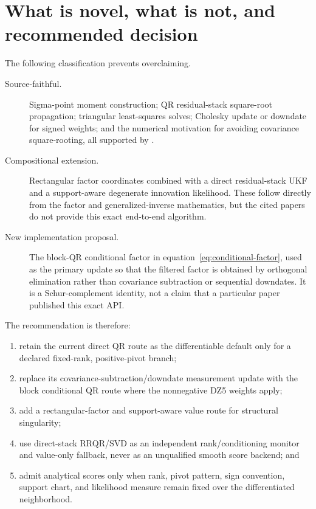 \documentclass[11pt]{article}
\begin{document}
\section{What is novel, what is not, and recommended decision}

The following classification prevents overclaiming.

\begin{description}
  \item[Source-faithful.] Sigma-point moment construction; QR residual-stack
    square-root propagation; triangular least-squares solves; Cholesky update or
    downdate for signed weights; and the numerical motivation for avoiding
    covariance square-rooting, all supported by
    \cite{vandermerwewan2001,arasaratnamhaykin2008,arasaratnamhaykin2009,
    kaminski1971,bierman1977}.
  \item[Compositional extension.] Rectangular factor coordinates combined with
    a direct residual-stack UKF and a support-aware degenerate innovation
    likelihood.  These follow directly from the factor and generalized-inverse
    mathematics, but the cited papers do not provide this exact end-to-end
    algorithm.
  \item[New implementation proposal.] The block-QR conditional factor in
    equation~\eqref{eq:conditional-factor}, used as the primary update so that the
    filtered factor is obtained by orthogonal elimination rather than
    covariance subtraction or sequential downdates.  It is a Schur-complement
    identity, not a claim that a particular paper published this exact API.
\end{description}

The recommendation is therefore:
\begin{enumerate}
  \item retain the current direct QR route as the differentiable default only
        for a declared fixed-rank, positive-pivot branch;
  \item replace its covariance-subtraction/downdate measurement update with the
        block conditional QR route where the nonnegative DZ5 weights apply;
  \item add a rectangular-factor and support-aware value route for structural
        singularity;
  \item use direct-stack RRQR/SVD as an independent rank/conditioning monitor
        and value-only fallback, never as an unqualified smooth score backend;
        and
  \item admit analytical scores only when rank, pivot pattern, sign convention,
        support chart, and likelihood measure remain fixed over the differentiated
        neighborhood.
\end{enumerate}
\end{document}
